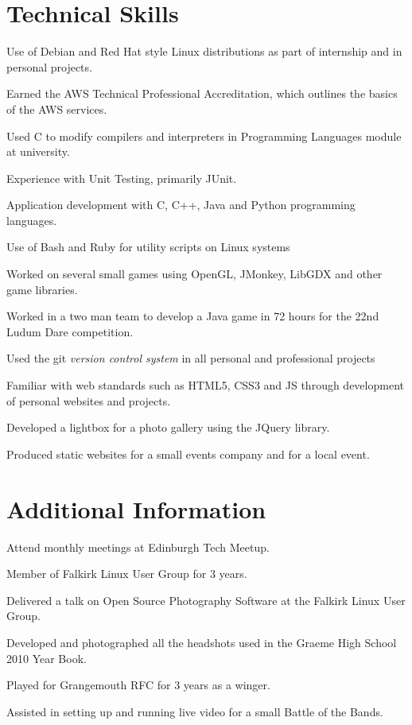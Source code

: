 \documentclass[11pt,a4paper]{article}
\renewenvironment{itemize}{
  \begin{list}{}{
    \setlength{\leftmargin}{1em}
    \setlength{\itemsep}{0.25em}
    \setlength{\parskip}{0pt}
    \setlength{\parsep}{0.25em}
    \renewcommand{\labelitemi}{$\bullet$}
  }
}{
  \end{list}
}
\begin{document}
\section*{Technical Skills}


\begin{itemize}
    \item Use of Debian and Red Hat style Linux distributions as part of internship and in personal projects.
    \item Earned the AWS Technical Professional Accreditation, which outlines the basics of the AWS services.
    \item Used C to modify compilers and interpreters in Programming Languages module at university.
    \item Experience with Unit Testing, primarily JUnit.
    \item Application development with C, C++, Java and Python programming languages.
    \item Use of Bash and Ruby for utility scripts on Linux systems 
    \item Worked on several small games using OpenGL, JMonkey, LibGDX and other game libraries.
    \item Worked in a  two man team to develop a Java game in 72 hours for the
        22nd Ludum Dare competition.
    \item Used the git \emph{version control system} in all personal and professional projects
    \item Familiar with web standards such as HTML5, CSS3 and JS through development of personal websites and projects.
    \item Developed a lightbox for a photo gallery using the JQuery library.
    \item Produced static websites for a small events company and for a local event.
\end{itemize}

\section*{Additional Information}

\begin{itemize}
    \item Attend monthly meetings at Edinburgh Tech Meetup.
    \item Member of Falkirk Linux User Group for 3 years.
    \item Delivered a talk on Open Source Photography Software at the Falkirk
        Linux User Group.
    \item Developed and photographed all the headshots used in the Graeme High
        School 2010 Year Book.
    \item Played for Grangemouth RFC for 3 years as a winger.
    \item Assisted in setting up and running live video for a small Battle of
        the Bands.
\end{itemize}
\end{document}
